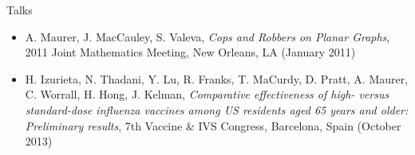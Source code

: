 \documentclass{resume} %
\begin{document}

\begin{rSection}{Talks}
\begin{itemize}
	\item A. Maurer, J. MacCauley, S. Valeva, {\em Cops and Robbers on Planar Graphs}, 2011 Joint Mathematics Meeting, New Orleans, LA 	(January 2011)

	\item H. Izurieta, N. Thadani, Y. Lu, R. Franks, T. MaCurdy,  D. Pratt, A. Maurer, C. Worrall, H. Hong, J. Kelman, {\em Comparative effectiveness of high- versus standard-dose influenza vaccines among US residents aged 65 years and older: Preliminary results}, 7th Vaccine \& IVS Congress, Barcelona, Spain (October 2013)
    \end{itemize}
\end{rSection}






\end{document}
